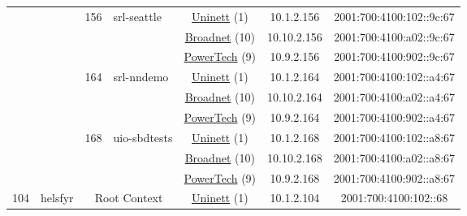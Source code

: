 \begin{small}
\begin{center}
\begin{longtable}{|c|c|c|c|c|c|c|c|}
  &  & \multirow{3}{*}{\tiny{156}} & \multicolumn{1}{|l|}{\multirow{3}{*}{\tiny{srl-seattle}}} & \multicolumn{2}{|c|}{\tiny{\href{https://www.uninett.no}{Uninett} (1)}} & \tiny{10.1.2.156} & \tiny{2001:700:4100:102::9c:67} \\* \cline{5-5}\cline{6-6}\cline{7-7}\cline{8-8}
  &  &  &  & \multicolumn{2}{|c|}{\tiny{\href{https://www.broadnet.no}{Broadnet} (10)}} & \tiny{10.10.2.156} & \tiny{2001:700:4100:a02::9c:67} \\* \cline{5-5}\cline{6-6}\cline{7-7}\cline{8-8}
  &  &  &  & \multicolumn{2}{|c|}{\tiny{\href{http://www.powertech.no}{PowerTech} (9)}} & \tiny{10.9.2.156} & \tiny{2001:700:4100:902::9c:67} \\* \cline{3-3}\cline{4-4}\cline{5-5}\cline{6-6}\cline{7-7}\cline{8-8}
  &  & \multirow{3}{*}{\tiny{164}} & \multicolumn{1}{|l|}{\multirow{3}{*}{\tiny{srl-nndemo}}} & \multicolumn{2}{|c|}{\tiny{\href{https://www.uninett.no}{Uninett} (1)}} & \tiny{10.1.2.164} & \tiny{2001:700:4100:102::a4:67} \\* \cline{5-5}\cline{6-6}\cline{7-7}\cline{8-8}
  &  &  &  & \multicolumn{2}{|c|}{\tiny{\href{https://www.broadnet.no}{Broadnet} (10)}} & \tiny{10.10.2.164} & \tiny{2001:700:4100:a02::a4:67} \\* \cline{5-5}\cline{6-6}\cline{7-7}\cline{8-8}
  &  &  &  & \multicolumn{2}{|c|}{\tiny{\href{http://www.powertech.no}{PowerTech} (9)}} & \tiny{10.9.2.164} & \tiny{2001:700:4100:902::a4:67} \\* \cline{3-3}\cline{4-4}\cline{5-5}\cline{6-6}\cline{7-7}\cline{8-8}
  &  & \multirow{3}{*}{\tiny{168}} & \multicolumn{1}{|l|}{\multirow{3}{*}{\tiny{uio-sbdtests}}} & \multicolumn{2}{|c|}{\tiny{\href{https://www.uninett.no}{Uninett} (1)}} & \tiny{10.1.2.168} & \tiny{2001:700:4100:102::a8:67} \\* \cline{5-5}\cline{6-6}\cline{7-7}\cline{8-8}
  &  &  &  & \multicolumn{2}{|c|}{\tiny{\href{https://www.broadnet.no}{Broadnet} (10)}} & \tiny{10.10.2.168} & \tiny{2001:700:4100:a02::a8:67} \\* \cline{5-5}\cline{6-6}\cline{7-7}\cline{8-8}
  &  &  &  & \multicolumn{2}{|c|}{\tiny{\href{http://www.powertech.no}{PowerTech} (9)}} & \tiny{10.9.2.168} & \tiny{2001:700:4100:902::a8:67} \\ \hline
 \multirow{27}{*}{\tiny{104}} & \multicolumn{1}{|l|}{\multirow{27}{*}{\tiny{helsfyr}}} & \multicolumn{2}{|c|}{\multirow{3}{*}{\tiny{Root Context}}} & \multicolumn{2}{|c|}{\tiny{\href{https://www.uninett.no}{Uninett} (1)}} & \tiny{10.1.2.104} & \tiny{2001:700:4100:102::68} \\* \cline{5-5}\cline{6-6}\cline{7-7}\cline{8-8}

\end{longtable}
\end{center}
\end{small}
